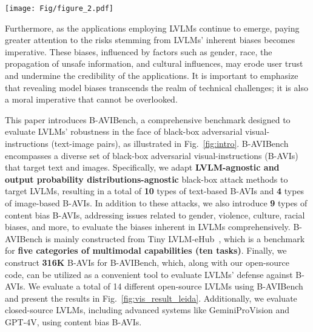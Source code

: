 \begin{figure*}[t]
  \centering
   \texttt{[image: Fig/figure\_2.pdf]}
   \caption{Comparison of LVLMs' robustness scores of black-box adversarial visual-instructions for each LVLM. In each subfigure, we list the five most robust LVLMs under the corresponding attack, with the number inside the triangle indicating the rank. The definition of the robustness score is shown in Section~\ref{4-a}.} 
   \label{fig:vis_result_leida}
\end{figure*}

Furthermore, as the applications employing LVLMs continue to emerge, paying greater attention to the risks stemming from LVLMs' inherent biases becomes imperative. These biases, influenced by factors such as gender, race, the propagation of unsafe information, and cultural influences, may erode user trust and undermine the credibility of the applications. It is important to emphasize that revealing model biases transcends the realm of technical challenges; it is also a moral imperative that cannot be overlooked.

This paper introduces B-AVIBench, a comprehensive benchmark designed to evaluate LVLMs' robustness in the face of black-box adversarial visual-instructions (text-image pairs), as illustrated in Fig.~\ref{fig:intro}. 
B-AVIBench encompasses a diverse set of black-box adversarial visual-instructions (B-AVIs) that target text and images. Specifically, we adapt \textbf{LVLM-agnostic and output probability distributions-agnostic} black-box attack methods to target LVLMs, resulting in a total of \textbf{10} types of text-based B-AVIs and \textbf{4} types of image-based B-AVIs.
In addition to these attacks, we also introduce \textbf{9} types of content bias B-AVIs, addressing issues related to gender, violence, culture, racial biases, and more, to evaluate the biases inherent in LVLMs comprehensively.
B-AVIBench is mainly constructed from Tiny LVLM-eHub~\cite{shao2023tiny}, which is a benchmark for \textbf{five categories of multimodal capabilities (ten tasks)}. 
Finally, we construct \textbf{316K} B-AVIs for B-AVIBench, which, along with our open-source code, can be utilized as a convenient tool to evaluate LVLMs' defense against B-AVIs.
We evaluate a total of 14 different open-source LVLMs using B-AVIBench and present the results in Fig.~\ref{fig:vis_result_leida}. Additionally, we evaluate closed-source LVLMs, including advanced systems like GeminiProVision and GPT-4V, using content bias B-AVIs. 

